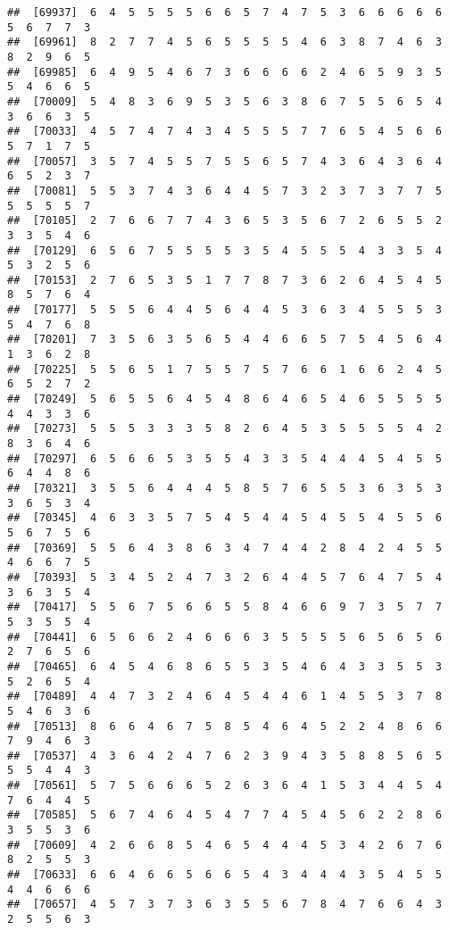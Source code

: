 \documentclass[
]{book}
\begin{document}
\begin{verbatim}
##  [69937]  6  4  5  5  5  5  6  6  5  7  4  7  5  3  6  6  6  6  6  5  6  7  7  3
##  [69961]  8  2  7  7  4  5  6  5  5  5  5  4  6  3  8  7  4  6  3  8  2  9  6  5
##  [69985]  6  4  9  5  4  6  7  3  6  6  6  6  2  4  6  5  9  3  5  5  4  6  6  5
##  [70009]  5  4  8  3  6  9  5  3  5  6  3  8  6  7  5  5  6  5  4  3  6  6  3  5
##  [70033]  4  5  7  4  7  4  3  4  5  5  5  7  7  6  5  4  5  6  6  5  7  1  7  5
##  [70057]  3  5  7  4  5  5  7  5  5  6  5  7  4  3  6  4  3  6  4  6  5  2  3  7
##  [70081]  5  5  3  7  4  3  6  4  4  5  7  3  2  3  7  3  7  7  5  5  5  5  5  7
##  [70105]  2  7  6  6  7  7  4  3  6  5  3  5  6  7  2  6  5  5  2  3  3  5  4  6
##  [70129]  6  5  6  7  5  5  5  5  3  5  4  5  5  5  4  3  3  5  4  5  3  2  5  6
##  [70153]  2  7  6  5  3  5  1  7  7  8  7  3  6  2  6  4  5  4  5  8  5  7  6  4
##  [70177]  5  5  5  6  4  4  5  6  4  4  5  3  6  3  4  5  5  5  3  5  4  7  6  8
##  [70201]  7  3  5  6  3  5  6  5  4  4  6  6  5  7  5  4  5  6  4  1  3  6  2  8
##  [70225]  5  5  6  5  1  7  5  5  7  5  7  6  6  1  6  6  2  4  5  6  5  2  7  2
##  [70249]  5  6  5  5  6  4  5  4  8  6  4  6  5  4  6  5  5  5  5  4  4  3  3  6
##  [70273]  5  5  5  3  3  3  5  8  2  6  4  5  3  5  5  5  5  4  2  8  3  6  4  6
##  [70297]  6  5  6  6  5  3  5  5  4  3  3  5  4  4  4  5  4  5  5  6  4  4  8  6
##  [70321]  3  5  5  6  4  4  4  5  8  5  7  6  5  5  3  6  3  5  3  3  6  5  3  4
##  [70345]  4  6  3  3  5  7  5  4  5  4  4  5  4  5  5  4  5  5  6  5  6  7  5  6
##  [70369]  5  5  6  4  3  8  6  3  4  7  4  4  2  8  4  2  4  5  5  4  6  6  7  5
##  [70393]  5  3  4  5  2  4  7  3  2  6  4  4  5  7  6  4  7  5  4  3  6  3  5  4
##  [70417]  5  5  6  7  5  6  6  5  5  8  4  6  6  9  7  3  5  7  7  5  3  5  5  4
##  [70441]  6  5  6  6  2  4  6  6  6  3  5  5  5  5  6  5  6  5  6  2  7  6  5  6
##  [70465]  6  4  5  4  6  8  6  5  5  3  5  4  6  4  3  3  5  5  3  5  2  6  5  4
##  [70489]  4  4  7  3  2  4  6  4  5  4  4  6  1  4  5  5  3  7  8  5  4  6  3  6
##  [70513]  8  6  6  4  6  7  5  8  5  4  6  4  5  2  2  4  8  6  6  7  9  4  6  3
##  [70537]  4  3  6  4  2  4  7  6  2  3  9  4  3  5  8  8  5  6  5  5  5  4  4  3
##  [70561]  5  7  5  6  6  6  5  2  6  3  6  4  1  5  3  4  4  5  4  7  6  4  4  5
##  [70585]  5  6  7  4  6  4  5  4  7  7  4  5  4  5  6  2  2  8  6  3  5  5  3  6
##  [70609]  4  2  6  6  8  5  4  6  5  4  4  4  5  3  4  2  6  7  6  8  2  5  5  3
##  [70633]  6  6  4  6  6  5  6  6  5  4  3  4  4  4  3  5  4  5  5  4  4  6  6  6
##  [70657]  4  5  7  3  7  3  6  3  5  5  6  7  8  4  7  6  6  4  3  2  5  5  6  3

\end{verbatim}
\end{document}
